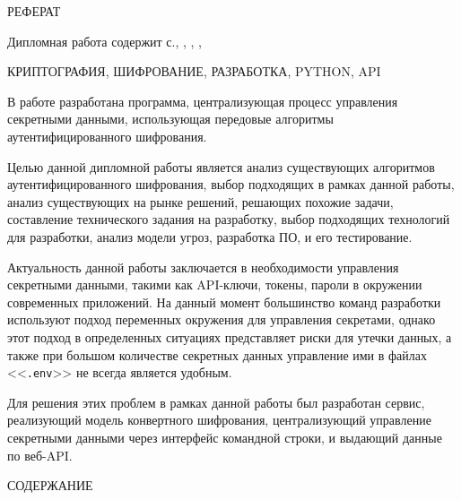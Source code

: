 \documentclass[14pt, a4paper]{extarticle}
\begin{document}
	
	
	

	\thispagestyle{empty}
	
	{\centering РЕФЕРАТ\par}
	
	\vspace*{\baselineskip}
	
	Дипломная работа содержит \pageref*{bib:end}с., \tablesBeforeBib{} \russianTables{\tablesBeforeBib}, \totalappendices{} \russianAppendices{\totalappendices}, \totalbibitems{} \russianSources{\totalbibitems}, \listingsBeforeBib{} \russianListings{\listingsBeforeBib}
	
	\vspace*{\baselineskip}
	
	КРИПТОГРАФИЯ, ШИФРОВАНИЕ, РАЗРАБОТКА, PYTHON, API
	
	\vspace*{\baselineskip}
	
	В работе разработана программа, централизующая процесс управления секретными данными, использующая передовые алгоритмы аутентифицированного шифрования.
	
	Целью данной дипломной работы является анализ существующих алгоритмов аутентифицированного шифрования, выбор подходящих в рамках данной работы, анализ существующих на рынке решений, решающих похожие задачи, составление технического задания на разработку, выбор подходящих технологий для разработки, анализ модели угроз, разработка ПО, и его тестирование.
	
	Актуальность данной работы заключается в необходимости управления секретными данными, такими как API-ключи, токены, пароли в окружении современных приложений. На данный момент большинство команд разработки используют подход переменных окружения для управления секретами, однако этот подход в определенных ситуациях представляет риски для утечки данных, а также при большом количестве секретных данных управление ими в файлах <<\texttt{.env}>> не всегда является удобным.
	
	Для решения этих проблем в рамках данной работы был разработан сервис, реализующий модель конвертного шифрования, централизующий управление секретными данными через интерфейс командной строки, и выдающий данные по веб-API.
		\newpage

	{\centering СОДЕРЖАНИЕ\par}
	
	\vspace*{-1.6cm}
\end{document}
